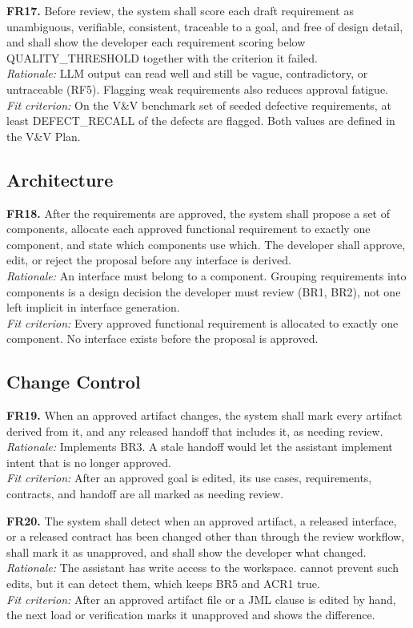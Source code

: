 \documentclass[12pt]{article}
\begin{document}
\medskip
\noindent\textbf{FR17.} Before review, the system shall score each draft
requirement as unambiguous, verifiable, consistent, traceable to a goal, and
free of design detail, and shall show the developer each requirement scoring
below QUALITY\_THRESHOLD together with the criterion it failed.\\
\textit{Rationale:} LLM output can read well and still be vague, contradictory,
or untraceable (RF5). Flagging weak requirements also reduces approval fatigue.\\
\textit{Fit criterion:} On the V\&V benchmark set of seeded defective
requirements, at least DEFECT\_RECALL of the defects are flagged. Both values
are defined in the V\&V Plan.

\subsection{Architecture}

\medskip
\noindent\textbf{FR18.} After the requirements are approved, the system shall
propose a set of components, allocate each approved functional requirement to
exactly one component, and state which components use which. The developer shall
approve, edit, or reject the proposal before any interface is derived.\\
\textit{Rationale:} An interface must belong to a component. Grouping
requirements into components is a design decision the developer must review
(BR1, BR2), not one left implicit in interface generation.\\
\textit{Fit criterion:} Every approved functional requirement is allocated to
exactly one component. No interface exists before the proposal is approved.

\subsection{Change Control}

\medskip
\noindent\textbf{FR19.} When an approved artifact changes, the system shall mark
every artifact derived from it, and any released handoff that includes it, as
needing review.\\
\textit{Rationale:} Implements BR3. A stale handoff would let the assistant
implement intent that is no longer approved.\\
\textit{Fit criterion:} After an approved goal is edited, its use cases,
requirements, contracts, and handoff are all marked as needing review.

\medskip
\noindent\textbf{FR20.} The system shall detect when an approved artifact, a
released interface, or a released contract has been changed other than through
the review workflow, shall mark it as unapproved, and shall show the developer
what changed.\\
\textit{Rationale:} The assistant has write access to the workspace.
\progname{} cannot prevent such edits, but it can detect them, which keeps BR5
and ACR1 true.\\
\textit{Fit criterion:} After an approved artifact file or a JML clause is
edited by hand, the next load or verification marks it unapproved and shows the
difference.
\end{document}
